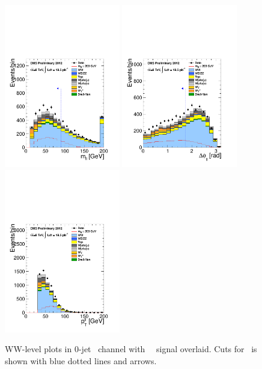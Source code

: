 \begin{figure}[htp]
\includegraphics[width=0.45\textwidth]{figures/hww_analysis16_200_ALL_of_0j_mll.pdf}
\includegraphics[width=0.45\textwidth]{figures/hww_analysis16_200_ALL_of_0j_dphi.pdf}
\includegraphics[width=0.45\textwidth]{figures/hww_analysis16_200_ALL_of_0j_ptll.pdf}
\caption{ WW-level plots in 0-jet \DF\ channel with ~\GeV\ signal overlaid. 
Cuts for \GeV\ is shown with blue dotted lines and arrows. 
}
\label{fig:wwlevelmh200}
\end{figure}

